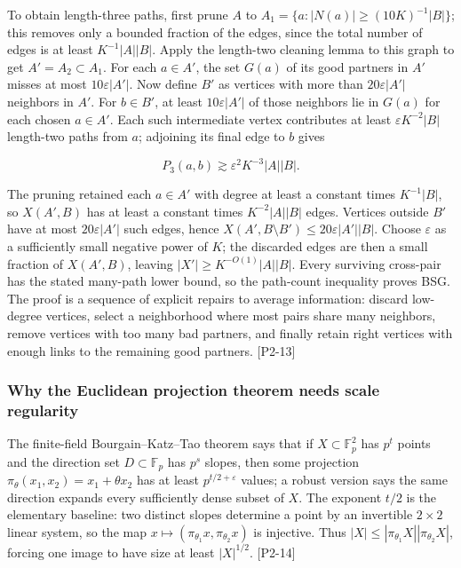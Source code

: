 To obtain length-three paths, first prune \(A\) to \(A_1=\{a:|N(a)|\ge (10K)^{-1}|B|\}\); this removes only a bounded fraction of the edges, since the total number of edges is at least \(K^{-1}|A||B|\). Apply the length-two cleaning lemma to this graph to get \(A'=A_2\subset A_1\). For each \(a\in A'\), the set \(G(a)\) of its good partners in \(A'\) misses at most \(10\varepsilon|A'|\). Now define \(B'\) as vertices with more than \(20\varepsilon|A'|\) neighbors in \(A'\). For \(b\in B'\), at least \(10\varepsilon|A'|\) of those neighbors lie in \(G(a)\) for each chosen \(a\in A'\). Each such intermediate vertex contributes at least \(\varepsilon K^{-2}|B|\) length-two paths from \(a\); adjoining its final edge to \(b\) gives

\[P_3(a,b)\gtrsim \varepsilon^2K^{-3}|A||B|.\]

The pruning retained each \(a\in A'\) with degree at least a constant times \(K^{-1}|B|\), so \(X(A',B)\) has at least a constant times \(K^{-2}|A||B|\) edges. Vertices outside \(B'\) have at most \(20\varepsilon|A'|\) such edges, hence \(X(A',B\setminus B')\le20\varepsilon|A'||B|\). Choose \(\varepsilon\) as a sufficiently small negative power of \(K\); the discarded edges are then a small fraction of \(X(A',B)\), leaving \(|X'|\ge K^{-O(1)}|A||B|\). Every surviving cross-pair has the stated many-path lower bound, so the path-count inequality proves BSG. The proof is a sequence of explicit repairs to average information: discard low-degree vertices, select a neighborhood where most pairs share many neighbors, remove vertices with too many bad partners, and finally retain right vertices with enough links to the remaining good partners. {[}P2-13{]}

\subsubsection{Why the Euclidean projection theorem needs scale regularity}\label{04-visual-computing-ii-ch033-why-the-euclidean-projection-theorem-needs-scale-regularity-1}

The finite-field Bourgain--Katz--Tao theorem says that if \(X\subset\mathbb F_p^2\) has \(p^t\) points and the direction set \(D\subset\mathbb F_p\) has \(p^s\) slopes, then some projection \(\pi_\theta(x_1,x_2)=x_1+\theta x_2\) has at least \(p^{t/2+\varepsilon}\) values; a robust version says the same direction expands every sufficiently dense subset of \(X\). The exponent \(t/2\) is the elementary baseline: two distinct slopes determine a point by an invertible \(2\times2\) linear system, so the map \(x\mapsto(\pi_{\theta_1}x,\pi_{\theta_2}x)\) is injective. Thus \(|X|\le |\pi_{\theta_1}X||\pi_{\theta_2}X|\), forcing one image to have size at least \(|X|^{1/2}\). {[}P2-14{]}

